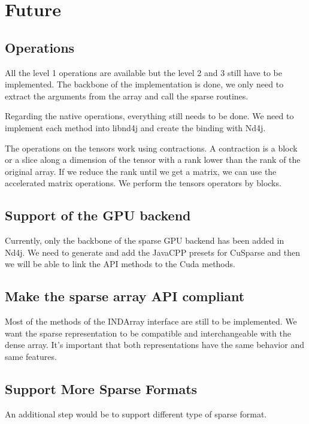 \chapter{Future}

\section{Operations}

All the level 1 operations are available but the level 2 and 3 still have to be implemented. The backbone of the implementation is done, we only need to extract the arguments from the array and call the sparse routines.

Regarding the native operations, everything still needs to be done. We need to implement each method into libnd4j and create the binding with Nd4j.

The operations on the tensors work using contractions. A contraction is a block or a slice along a dimension of the tensor with a rank lower than the rank of the original array. If we reduce the rank until we get a matrix, we can use the accelerated matrix operations. We perform the tensors operators by blocks.

\section{Support of the GPU backend}

Currently, only the backbone of the sparse GPU backend has been added in Nd4j. We need to generate and add the JavaCPP presets for CuSparse and then we will be able to link the API methods to the Cuda methods.

\section{Make the sparse array API compliant}

Most of the methods of the INDArray interface are still to be implemented. We want the sparse representation to be compatible and interchangeable with the dense array. It's important that both representations have the same behavior and same features.

\section{Support More Sparse Formats}
\label{sec:moreFormat}

An additional step would be to support different type of sparse format. 

